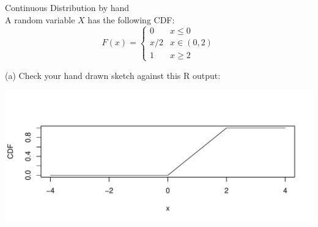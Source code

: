\documentclass[bigtut]{tutorial}\usepackage[]{graphicx}\usepackage[]{color}
\makeatletter
\def\maxwidth{ %
  \ifdim\Gin@nat@width>\linewidth
    \linewidth
  \else
    \Gin@nat@width
  \fi
}
\newenvironment{knitrout}{}{} %
\makeatother
\begin{document}
\begin{tutorial}
\begin{questions}
\question Continuous Distribution by hand \\

A random variable $X$ has the following CDF:
\[ F(x) =      \left\{     \begin{array}{ll} 0        & x \leq 0  \\
                                                         x/2     & x \in (0,2)  \\
                                                         1        & x \geq 2 
  		      \end{array}    \right.  \]




\begin{solution}
(a) Check your hand drawn sketch against this R output:

\begin{knitrout}
\color{fgcolor}
\includegraphics[width=\maxwidth]{figure/unnamed-chunk-21-1} 

\end{knitrout}



\end{solution}
\end{questions}
\end{tutorial}
\end{document}
